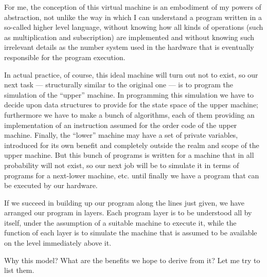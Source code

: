 For me, the conception of this virtual machine is an embodiment of my powers of abstraction, not unlike the way in which I can understand a program written in a so-called higher level language, without knowing how all kinds of operations (such as multiplication and subscription) are implemented and without knowing such irrelevant details as the number system used in the hardware that is eventually responsible for the program execution.

In actual practice, of course, this ideal machine will turn out not to exist, so our next task --- structurally similar to the original one --- is to program the simulation of the ``upper'' machine. In programming this simulation we have to decide upon data structures to provide for the state space of the upper machine; furthermore we have to make a bunch of algorithms, each of them providing an implementation of an instruction assumed for the order code of the upper machine. Finally, the ``lower'' machine may have a set of private variables, introduced for its own benefit and completely outside the realm and scope of the upper machine. But this bunch of programs is written for a machine that in all probability will not exist, so our next job will be to simulate it in terms of programs for a next-lower machine, etc. until finally we have a program that can be executed by our hardware.

If we succeed in building up our program along the lines just given, we have arranged our program in layers. Each program layer is to be understood all by itself, under the assumption of a suitable machine to execute it, while the function of each layer is to simulate the machine that is assumed to be available on the level immediately above it.

Why this model? What are the benefits we hope to derive from it? Let me try to list them.

